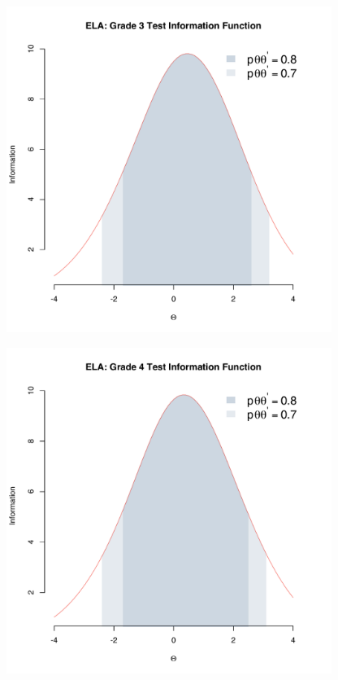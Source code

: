 \documentclass[]{article}
\begin{document}
\begin{figure}
\centering
\includegraphics[height=4.16667in]{tifs/ela3tif.pdf}
\caption{}
\end{figure}

\begin{figure}
\centering
\includegraphics[height=4.16667in]{tifs/ela4tif.pdf}
\caption{}
\end{figure}
\end{document}
